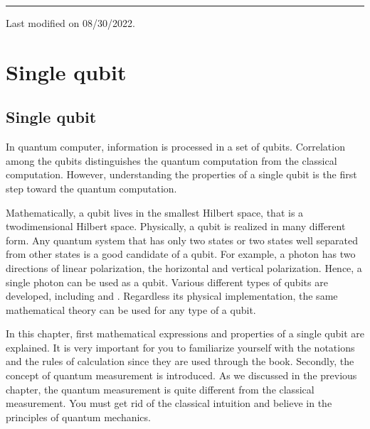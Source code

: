 \documentclass[letterpaper,10pt,english]{jupyterBook}
\begin{document}
\bigskip\hrule\bigskip


\sphinxAtStartPar
Last modified on 08/30/2022.

\sphinxstepscope


\part{Single qubit}

\sphinxstepscope


\chapter{Single qubit}
\label{\detokenize{qubit/intro:single-qubit}}\label{\detokenize{qubit/intro:chap-qubit1}}\label{\detokenize{qubit/intro::doc}}
\sphinxAtStartPar
In quantum computer, information is processed in a set of qubits.  Correlation among the qubits distinguishes the quantum computation from the classical computation.  However, understanding the properties of a single qubit is the first step toward the quantum computation.

\sphinxAtStartPar
Mathematically, a qubit lives in the smallest Hilbert space, that is a two\sphinxhyphen{}dimensional Hilbert space. Physically, a qubit is realized in many different form.  Any quantum system that has only two states or two states well separated from other states is a good candidate of a qubit.    For example, a photon  has two directions of linear polarization,  the horizontal and vertical polarization.  Hence, a single photon can be used as a qubit.  Various different types of qubits are developed, including  and .  Regardless its physical implementation, the same mathematical theory can be used for any type of a qubit.

\sphinxAtStartPar
In this chapter, first mathematical expressions and properties of a single qubit are explained. It is very important for you to familiarize yourself with the notations and the rules of calculation since they are used through the book.  Secondly, the concept of quantum measurement is introduced.  As we discussed in the previous chapter, the quantum measurement is quite different from the classical measurement.  You must get rid of the classical intuition and believe in the principles of quantum mechanics.
\end{document}
